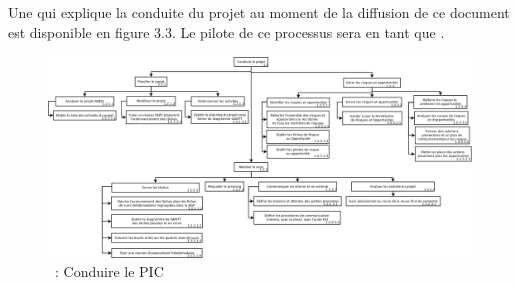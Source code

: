\subsection{\WBSCourt{}}
\label{ProcessusConduirePic}
Une \WBS{} qui explique la conduite du projet au moment de la diffusion de ce document est disponible en figure 3.3.
Le pilote de ce processus sera \Sergi{} en tant que \CP{}.
\newpage
\begin{figure}[H]
\centering
 \includegraphics[width=24cm,angle=90]{images/conduire_le_projet.png}
 \caption{\WBSCourt{}~: Conduire le PIC}
 \label{WBS3}
\end{figure}


